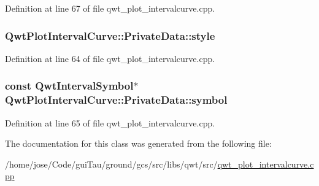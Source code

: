 Definition at line 67 of file qwt\-\_\-plot\-\_\-intervalcurve.\-cpp.

\hypertarget{class_qwt_plot_interval_curve_1_1_private_data_aa949ee723dc3c8f7c12edc323d6db5d0}{
\subsubsection[{style}]{ Qwt\-Plot\-Interval\-Curve\-::\-Private\-Data\-::style}}\label{class_qwt_plot_interval_curve_1_1_private_data_aa949ee723dc3c8f7c12edc323d6db5d0}


Definition at line 64 of file qwt\-\_\-plot\-\_\-intervalcurve.\-cpp.

\hypertarget{class_qwt_plot_interval_curve_1_1_private_data_a3e00aac3883a2f972dee4ec100a568ff}{
\subsubsection[{symbol}]{\setlength{\rightskip}{0pt plus 5cm}const {\bf Qwt\-Interval\-Symbol}$\ast$ Qwt\-Plot\-Interval\-Curve\-::\-Private\-Data\-::symbol}}\label{class_qwt_plot_interval_curve_1_1_private_data_a3e00aac3883a2f972dee4ec100a568ff}


Definition at line 65 of file qwt\-\_\-plot\-\_\-intervalcurve.\-cpp.



The documentation for this class was generated from the following file\-:\begin{DoxyCompactItemize}
\item 
/home/jose/\-Code/gui\-Tau/ground/gcs/src/libs/qwt/src/\hyperlink{qwt__plot__intervalcurve_8cpp}{qwt\-\_\-plot\-\_\-intervalcurve.\-cpp}\end{DoxyCompactItemize}

